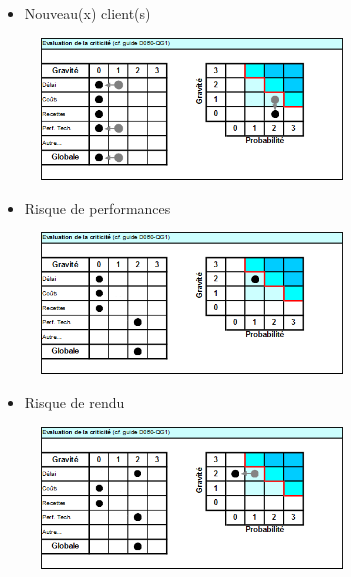 \documentclass[xcolor=dvipsnames]{beamer}
\begin{document}
	\begin{frame}{\secname}
		\begin{itemize}
			\item Nouveau(x) client(s)
		\end{itemize}
		\begin{figure}
			\includegraphics[width=8cm]{risque_nouveau_client.png}
		\end{figure}
		\begin{center}
			\legendeRisque
		\end{center}
	\end{frame}
	
	
	\begin{frame}{\secname}
		\begin{itemize}
			\item Risque de performances
		\end{itemize}
		\begin{figure}
			\includegraphics[width=8cm]{risque_performance.png}
		\end{figure}
		\begin{center}
			\legendeRisque
		\end{center}
	\end{frame}	
	
	
	\begin{frame}{\secname}
		\begin{itemize}
			\item Risque de rendu
		\end{itemize}
		\begin{figure}
			\includegraphics[width=8cm]{risque_rendu.png}
		\end{figure}
		\begin{center}
			\legendeRisque
		\end{center}
	\end{frame}
\end{document}
